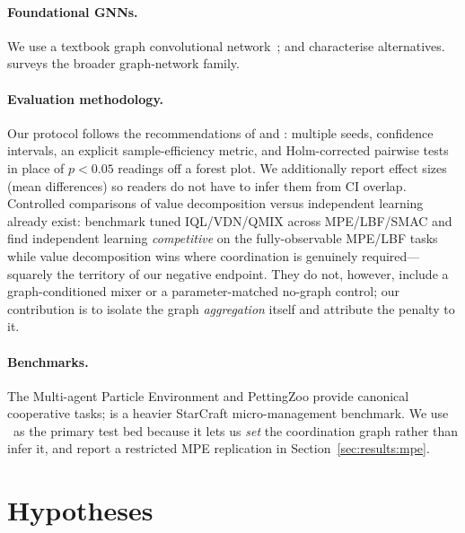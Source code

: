\paragraph{Foundational GNNs.} We use a textbook graph convolutional
network~\citep{kipf_2017_gcn}; \citet{velickovic_2018_gat} and
\citet{xu_2019_gin} characterise alternatives.
\citet{battaglia_2018_gn} surveys the broader graph-network family.

\paragraph{Evaluation methodology.} Our protocol follows the recommendations
of \citet{henderson_2018_drlmatters} and \citet{agarwal_2021_precipice}:
multiple seeds, confidence intervals, an explicit sample-efficiency metric,
and Holm-corrected pairwise tests in place of $p<0.05$ readings off a
forest plot. We additionally report effect sizes (mean differences) so
readers do not have to infer them from CI overlap. Controlled comparisons of
value decomposition versus independent learning already exist:
\citet{papoudakis_2021_benchmarking} benchmark tuned IQL/VDN/QMIX across
MPE/LBF/SMAC and find independent learning \emph{competitive} on the
fully-observable MPE/LBF tasks while value decomposition wins where
coordination is genuinely required---squarely the territory of our negative
endpoint. They do not, however, include a graph-conditioned mixer or a
parameter-matched no-graph control; our contribution is to isolate the graph
\emph{aggregation} itself and attribute the penalty to it.

\paragraph{Benchmarks.} The Multi-agent Particle Environment
\citep{lowe_2017_maddpg} and PettingZoo \citep{terry_2021_pettingzoo}
provide canonical cooperative tasks; 
\citep{samvelyan_2019_smac} is a heavier StarCraft micro-management
benchmark. We use \coordgrid\ as the primary test bed because it lets us
\emph{set} the coordination graph rather than infer it, and report a
restricted MPE replication in Section~\ref{sec:results:mpe}.

\section{Hypotheses}
\label{sec:hypotheses}

